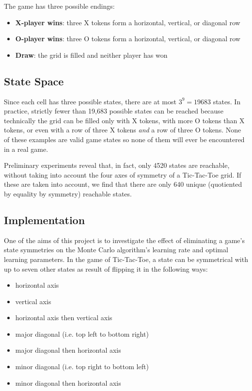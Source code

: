 \documentclass[11pt,a4paper]{report}
\begin{document}
The game has three possible endings:

\begin{itemize}
	\item \textbf{X-player wins}: three X tokens form a horizontal, vertical, or diagonal row
	\item \textbf{O-player wins}: three O tokens form a horizontal, vertical, or diagonal row
	\item \textbf{Draw}: the grid is filled and neither player has won
\end{itemize}


\subsection{State Space}
\label{sec:TicTacToeStateSpace}

Since each cell has three possible states, there are at most $3^9 = 19683$ states. In practice, strictly fewer than 19,683 possible states can be reached because technically the grid can be filled only with X tokens, with more O tokens than X tokens, or even with a row of three X tokens \emph{and} a row of three O tokens. None of these examples are valid game states so none of them will ever be encountered in a real game.

Preliminary experiments reveal that, in fact, only 4520 states are reachable, without taking into account the four axes of symmetry of a Tic-Tac-Toe grid. If these are taken into account, we find that there are only 640 unique (quotiented by equality by symmetry) reachable states.


\subsection{Implementation}
\label{sec:TicTacToeImplementation}

One of the aims of this project is to investigate the effect of eliminating a game's state symmetries on the Monte Carlo algorithm's learning rate and optimal learning parameters. In the game of Tic-Tac-Toe, a state can be symmetrical with up to seven other states as result of flipping it in the following ways:

\begin{itemize}
	\item horizontal axis
	\item vertical axis
	\item horizontal axis then vertical axis
	\item major diagonal (i.e. top left to bottom right)
	\item major diagonal then horizontal axis
	\item minor diagonal (i.e. top right to bottom left)
	\item minor diagonal then horizontal axis
\end{itemize}
\end{document}
